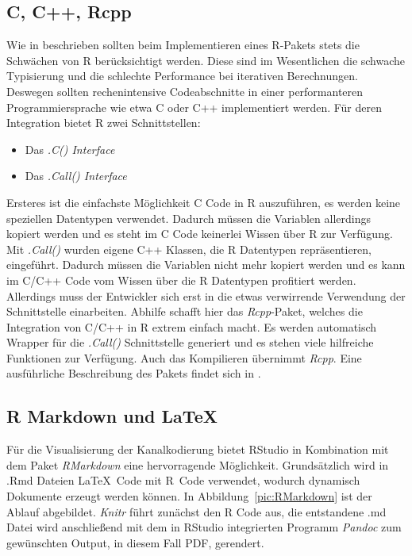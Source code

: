 \subsection{C, C++, Rcpp}

Wie in \cite{Rextension} beschrieben sollten beim Implementieren eines R-Pakets stets die Schwächen von R berücksichtigt werden. Diese sind im Wesentlichen die schwache Typisierung und die schlechte Performance bei iterativen Berechnungen. Deswegen sollten rechenintensive Codeabschnitte in einer performanteren Programmiersprache wie etwa C oder C++ implementiert werden. Für deren Integration bietet R zwei Schnittstellen:

\begin{itemize}
\item Das \emph{.C() Interface}
\item Das \emph{.Call() Interface}
\end{itemize}

Ersteres ist die einfachste Möglichkeit C Code in R auszuführen, es werden keine speziellen Datentypen verwendet. Dadurch müssen die Variablen allerdings kopiert werden und es steht im C Code keinerlei Wissen über R zur Verfügung.
Mit \emph{.Call()} wurden eigene C++ Klassen, die R Datentypen repräsentieren, eingeführt. Dadurch müssen die Variablen nicht mehr kopiert werden und es kann im C/C++ Code vom Wissen über die R Datentypen profitiert werden.\cite{wickham2015r} Allerdings muss der Entwickler sich erst in die etwas verwirrende Verwendung der Schnittstelle einarbeiten. Abhilfe schafft hier das \emph{Rcpp}-Paket, welches die Integration von C/C++ in R extrem einfach macht. Es werden automatisch Wrapper für die \emph{.Call()} Schnittstelle generiert und es stehen viele hilfreiche Funktionen zur Verfügung. Auch das Kompilieren übernimmt \emph{Rcpp}. Eine ausführliche Beschreibung des Pakets findet sich in \cite{wickham2015advanced}.

\subsection{R Markdown und \LaTeX}

Für die Visualisierung der Kanalkodierung bietet RStudio in Kombination mit dem Paket \emph{RMarkdown} eine hervorragende Möglichkeit. Grundsätzlich wird in .Rmd Dateien \LaTeX~Code  mit R~Code verwendet, wodurch dynamisch Dokumente erzeugt werden können. In Abbildung~\ref{pic:RMarkdown} ist der Ablauf abgebildet. \emph{Knitr} führt zunächst den R Code aus, die entstandene .md Datei wird anschließend mit dem in RStudio integrierten Programm \emph{Pandoc} zum gewünschten Output, in diesem Fall PDF, gerendert.\cite{rmarkdown}

